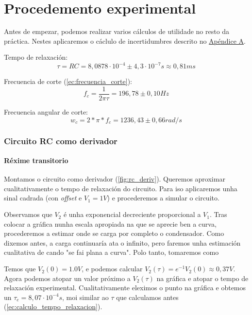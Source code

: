 \documentclass[12pt, a4paper, titlepage]{article}
\begin{document}
  \newpage
  \part{Procedemento experimental}

  Antes de empezar, podemos realizar varios cálculos de utilidade no resto da práctica. Nestes aplicaremos o cáclulo de incertidumbres descrito no \hyperref[sec:incertidumbres]{Apéndice A}.

  Tempo de relaxación:
  \begin{equation} \label{ec:calculo_tempo_relaxacion}
    \tau = RC = 8,0878 \cdot 10^{-4} \pm 4,3 \cdot 10^{-7} s \approx 0,81 ms
  \end{equation}

  Frecuencia de corte (\ref{ec:frecuencia_corte}):
  \begin{equation} \label{ec:calculo_frecuencia_corte}
    f_c = \frac{1}{2 \pi \tau} = 196,78 \pm 0,10 Hz
  \end{equation}

  Frecuencia angular de corte:
  \begin{equation}
    w_c = 2 * \pi * f_c = 1236,43 \pm 0,66 rad/s
  \end{equation}

    \section{Circuito RC como derivador}

    \subsection{Réxime transitorio}

    Montamos o circuito como derivador (\ref{fig:rc_deriv}).
    Queremos aproximar cualitativamente o tempo de relaxación do circuito.
    Para iso aplicaremos unha sinal cadrada (con \textit{offset} e $V_1 = 1V$) e procederemos a simular o circuito.

    Observamos que $V_2$ é unha exponencial decreciente proporcional a $V_1$.
    Tras colocar a gráfica nunha escala apropiada na que se aprecie ben a curva, procederemos a estimar onde se carga por completo o condensador.
    Como dixemos antes, a carga continuaría ata o infinito, pero faremos unha estimación cualitativa de cando "se fai plana a curva". Polo tanto, tomaremos como 

    Temos que $V_2(0) = 1.0V$, e podemos calcular $V_2(\tau) = e^{-1}V_2(0) \approx 0,37V$. Agora podemos atopar un valor próximo a $V_2(\tau)$ na gráfica e atopar o tempo de relaxación experimental.
    Cualitativamente eleximos o punto na gráfica e obtemos un $\tau_e = 8,07 \cdot 10^{-4} s$, moi similar ao $\tau$ que calculamos antes (\ref{ec:calculo_tempo_relaxacion}).
\end{document}
